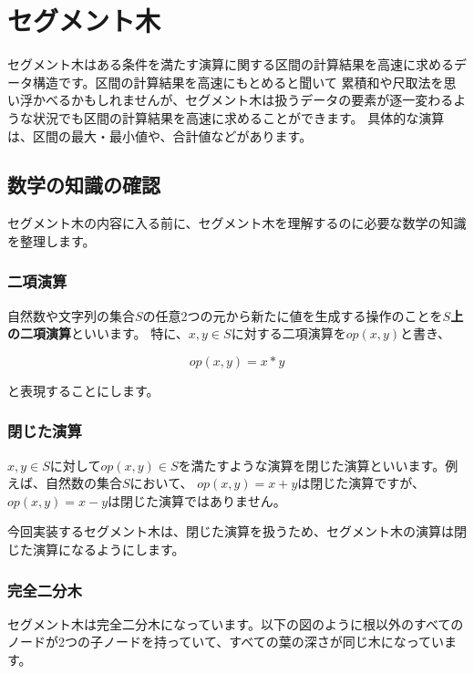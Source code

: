 \newpage

\section{セグメント木}
セグメント木はある条件を満たす演算に関する区間の計算結果を高速に求めるデータ構造です。区間の計算結果を高速にもとめると聞いて
累積和や尺取法を思い浮かべるかもしれませんが、セグメント木は扱うデータの要素が逐一変わるような状況でも区間の計算結果を高速に求めることができます。
具体的な演算は、区間の最大・最小値や、合計値などがあります。

\subsection{数学の知識の確認}
セグメント木の内容に入る前に、セグメント木を理解するのに必要な数学の知識を整理します。

\subsubsection{二項演算}

自然数や文字列の集合$S$の任意2つの元から新たに値を生成する操作のことを\textbf{$S$上の二項演算}といいます。
特に、$x, y \in S$に対する二項演算を$op(x, y)$と書き、

\begin{equation*}
	op(x, y) = x * y
\end{equation*}

と表現することにします。

\subsubsection{閉じた演算}
$x, y \in S$に対して$op(x, y) \in S$を満たすような演算を閉じた演算といいます。例えば、自然数の集合$S$において、
$op(x, y) = x + y$は閉じた演算ですが、$op(x, y) = x - y$は閉じた演算ではありません。

今回実装するセグメント木は、閉じた演算を扱うため、セグメント木の演算は閉じた演算になるようにします。

\subsubsection{完全二分木}
セグメント木は完全二分木になっています。以下の図のように根以外のすべてのノードが2つの子ノードを持っていて、すべての葉の深さが同じ木になっています。

\vspace{0.25cm}

